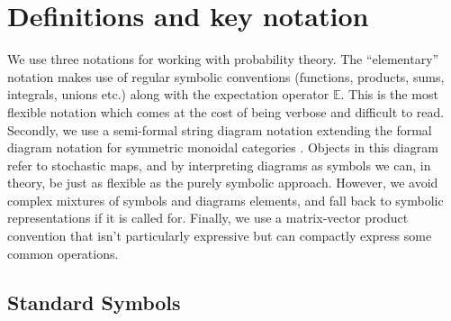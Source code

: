 
\section{Definitions and key notation}\label{sec:dfin}

We use three notations for working with probability theory. The ``elementary'' notation makes use of regular symbolic conventions (functions, products, sums, integrals, unions etc.) along with the expectation operator $\mathbb{E}$. This is the most flexible notation which comes at the cost of being verbose and difficult to read. Secondly, we use a semi-formal string diagram notation extending the formal diagram notation for symmetric monoidal categories \cite{selinger_survey_2010}. Objects in this diagram refer to stochastic maps, and by interpreting diagrams as symbols we can, in theory, be just as flexible as the purely symbolic approach. However, we avoid complex mixtures of symbols and diagrams elements, and fall back to symbolic representations if it is called for. Finally, we use a matrix-vector product convention that isn't particularly expressive but can compactly express some common operations.

\subsection{Standard Symbols}

